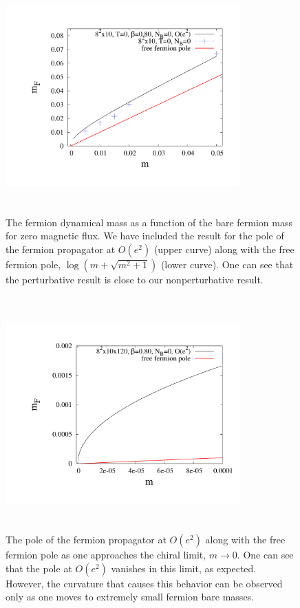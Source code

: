 \documentclass[aps,prd,twocolumn,showpacs,superscriptaddress,groupedaddress]{revtex4}  %
\begin{document}
\begin{figure}
\vspace{-1.2cm}
  \includegraphics[height=9cm,width=9cm]{ferm_pole_vs_m.pdf} 
  \vspace{-1.25cm}
\caption{The fermion dynamical mass as a function of the bare fermion mass for zero magnetic flux. We have included the result for the pole of the fermion propagator at $O(e^2)$ (upper curve) along with the free fermion pole, $\log\left(m+\sqrt{m^2+1}\right)$ (lower curve). One can see that the perturbative result is close to our nonperturbative result.}
\label{MFvsmZeroB}
\end{figure}

\begin{figure}
\vspace{-1.2cm}
  \includegraphics[height=9cm,width=9cm]{ferm_pole_vs_m_zoom.pdf} 
  \vspace{-1.25cm}
\caption{The pole of the fermion propagator at $O(e^2)$ along with the free fermion pole as one approaches the chiral limit, $m \to 0$. One can see that the pole at $O(e^2)$ vanishes in this limit, as expected. However, the curvature that causes this behavior can be observed only as one moves to extremely small fermion bare masses.}
\label{MFvsmZeroBZoom}
\end{figure}
\end{document}
